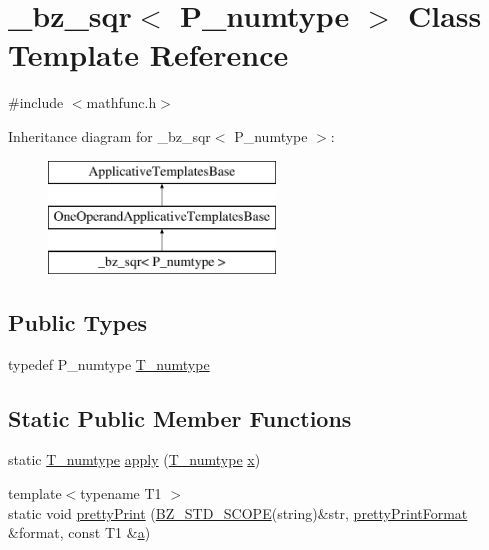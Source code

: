 \hypertarget{class__bz__sqr}{}\section{\+\_\+bz\+\_\+sqr$<$ P\+\_\+numtype $>$ Class Template Reference}
\label{class__bz__sqr}


{\ttfamily \#include $<$mathfunc.\+h$>$}

Inheritance diagram for \+\_\+bz\+\_\+sqr$<$ P\+\_\+numtype $>$\+:\begin{figure}[H]
\begin{center}
\leavevmode
\includegraphics[height=3.000000cm]{class__bz__sqr}
\end{center}
\end{figure}
\subsection*{Public Types}
\begin{DoxyCompactItemize}
\item 
typedef P\+\_\+numtype \hyperlink{class__bz__sqr_ad6600e799ffe9cd64faffa74993aa2e6}{T\+\_\+numtype}
\end{DoxyCompactItemize}
\subsection*{Static Public Member Functions}
\begin{DoxyCompactItemize}
\item 
static \hyperlink{class__bz__sqr_ad6600e799ffe9cd64faffa74993aa2e6}{T\+\_\+numtype} \hyperlink{class__bz__sqr_a12b273f13fb924662719b44d02e60c26}{apply} (\hyperlink{class__bz__sqr_ad6600e799ffe9cd64faffa74993aa2e6}{T\+\_\+numtype} \hyperlink{vecnorm1_8cc_ac73eed9e41ec09d58f112f06c2d6cb63}{x})
\item 
{\footnotesize template$<$typename T1 $>$ }\\static void \hyperlink{class__bz__sqr_a49a4bb294861c3e30ab3c0c927c5e7b3}{pretty\+Print} (\hyperlink{numinquire_8h_a2b24ffc3b4ef9803956bc7715c6c7b83}{B\+Z\+\_\+\+S\+T\+D\+\_\+\+S\+C\+O\+P\+E}(string)\&str, \hyperlink{classprettyPrintFormat}{pretty\+Print\+Format} \&format, const T1 \&\hyperlink{gen__mat5files_8m_aae328bf20413f220e38aec4d95bfd6da}{a})
\end{DoxyCompactItemize}


